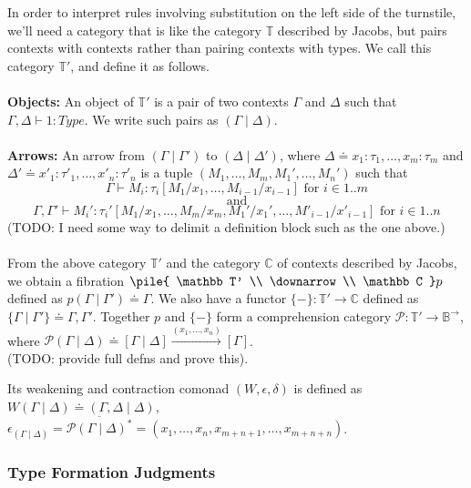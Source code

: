 \documentclass{article}
\newcommand{\vrt}[2]{
\pile{
#1 \\
\downarrow \\
#2
}
}
\begin{document}
In order to interpret rules involving substitution on the left side of the turnstile, we'll need a category that is like the category $\mathbb T$ described by Jacobs, but pairs contexts with contexts rather than pairing contexts with types. We call this category $\mathbb T'$, and define it as follows.
\\~\\
\textbf{Objects:} An object of $\mathbb T'$ is a pair of two contexts $\Gamma$ and $\Delta$ such that $\Gamma,\Delta \vdash 1 : Type$. We write such pairs as $(\Gamma \mid \Delta)$.\\~\\
\textbf{Arrows:} An arrow from $(\Gamma \mid \Gamma')$ to $(\Delta \mid \Delta')$, where $\Delta \doteq x_1 : \tau_1, \ldots, x_m : \tau_m$ and $\Delta' \doteq x'_1 : \tau'_1, \ldots, x'_n : \tau'_n$ is a tuple $(M_1, \ldots, M_m,M_1',\ldots,M_n')$ such that 
$$\Gamma \vdash M_i : \tau_i[M_1/x_1,\ldots,M_{i-1}/x_{i-1}] \text{ for } i \in 1..m$$
$$ \text{and} $$
$$\Gamma,\Gamma' \vdash M_i' : \tau_i'[M_1/x_1, \ldots, M_m/x_m, M_1' / x_1', \ldots, M'_{i-1}/x'_{i-1}] \text{ for } i \in 1..n$$
(TODO: I need some way to delimit a definition block such as the one above.)\\~\\
From the above category $\mathbb T'$ and the category $\mathbb C$ of contexts described by Jacobs, we obtain a fibration 
$\vrt{\mathbb T'}{\mathbb C}p$ defined as $p(\Gamma \mid \Gamma') \doteq \Gamma$. We also have a functor $\{ - \} : \mathbb T' \to \mathbb C$ defined as $\{ \Gamma \mid \Gamma' \} \doteq \Gamma,\Gamma'$. Together $p$ and $\{ - \}$ form a comprehension category $\mathcal P : \mathbb T' \to \mathbb B^{\to}$, where 
$\mathcal P(\Gamma \mid \Delta) \doteq [\Gamma \mid \Delta] \overset{(x_1, \ldots, x_n)}{\longrightarrow} [\Gamma]$.\\ (TODO: provide full defns and prove this).

Its weakening and contraction comonad $(W,\epsilon,\delta)$ is defined as $W(\Gamma \mid \Delta) \doteq (\Gamma,\Delta \mid \Delta)$, $\epsilon_{(\Gamma \mid \Delta)} = \overline{\mathcal P(\Gamma \mid \Delta)^*} = (x_1, \ldots, x_n, x_{m+n+1}, \ldots, x_{m+n+n})$.

\subsubsection*{Type Formation Judgments}
\end{document}

